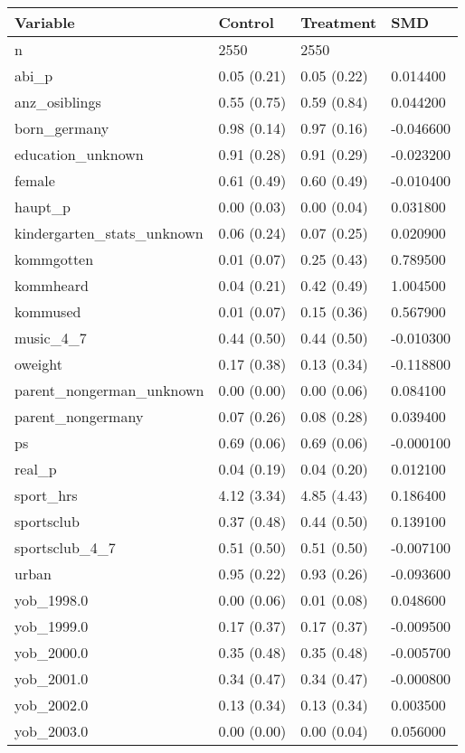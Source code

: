\begin{tabular}{llll}
\toprule
Variable & Control & Treatment & SMD \\
\midrule
n & 2550 & 2550 &  \\
abi\_p & 0.05 (0.21) & 0.05 (0.22) & 0.014400 \\
anz\_osiblings & 0.55 (0.75) & 0.59 (0.84) & 0.044200 \\
born\_germany & 0.98 (0.14) & 0.97 (0.16) & -0.046600 \\
education\_unknown & 0.91 (0.28) & 0.91 (0.29) & -0.023200 \\
female & 0.61 (0.49) & 0.60 (0.49) & -0.010400 \\
haupt\_p & 0.00 (0.03) & 0.00 (0.04) & 0.031800 \\
kindergarten\_stats\_unknown & 0.06 (0.24) & 0.07 (0.25) & 0.020900 \\
kommgotten & 0.01 (0.07) & 0.25 (0.43) & 0.789500 \\
kommheard & 0.04 (0.21) & 0.42 (0.49) & 1.004500 \\
kommused & 0.01 (0.07) & 0.15 (0.36) & 0.567900 \\
music\_4\_7 & 0.44 (0.50) & 0.44 (0.50) & -0.010300 \\
oweight & 0.17 (0.38) & 0.13 (0.34) & -0.118800 \\
parent\_nongerman\_unknown & 0.00 (0.00) & 0.00 (0.06) & 0.084100 \\
parent\_nongermany & 0.07 (0.26) & 0.08 (0.28) & 0.039400 \\
ps & 0.69 (0.06) & 0.69 (0.06) & -0.000100 \\
real\_p & 0.04 (0.19) & 0.04 (0.20) & 0.012100 \\
sport\_hrs & 4.12 (3.34) & 4.85 (4.43) & 0.186400 \\
sportsclub & 0.37 (0.48) & 0.44 (0.50) & 0.139100 \\
sportsclub\_4\_7 & 0.51 (0.50) & 0.51 (0.50) & -0.007100 \\
urban & 0.95 (0.22) & 0.93 (0.26) & -0.093600 \\
yob\_1998.0 & 0.00 (0.06) & 0.01 (0.08) & 0.048600 \\
yob\_1999.0 & 0.17 (0.37) & 0.17 (0.37) & -0.009500 \\
yob\_2000.0 & 0.35 (0.48) & 0.35 (0.48) & -0.005700 \\
yob\_2001.0 & 0.34 (0.47) & 0.34 (0.47) & -0.000800 \\
yob\_2002.0 & 0.13 (0.34) & 0.13 (0.34) & 0.003500 \\
yob\_2003.0 & 0.00 (0.00) & 0.00 (0.04) & 0.056000 \\
\bottomrule
\end{tabular}

